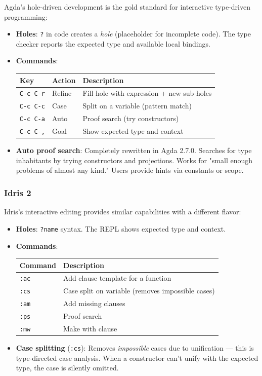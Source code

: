 \documentclass[11pt]{article}
\begin{document}
Agda's hole-driven development is the gold standard for interactive type-driven
programming:

\begin{itemize}
\item \textbf{Holes}: \texttt{?} in code creates a \emph{hole} (placeholder for incomplete code). The
type checker reports the expected type and available local bindings.

\item \textbf{Commands}:
\begin{center}
\begin{tabular}{lll}
Key & Action & Description\\
\hline
\texttt{C-c C-r} & Refine & Fill hole with expression + new sub-holes\\
\texttt{C-c C-c} & Case & Split on a variable (pattern match)\\
\texttt{C-c C-a} & Auto & Proof search (try constructors)\\
\texttt{C-c C-,} & Goal & Show expected type and context\\
\end{tabular}
\end{center}

\item \textbf{Auto proof search}: Completely rewritten in Agda 2.7.0. Searches for type
inhabitants by trying constructors and projections. Works for "small enough
problems of almost any kind." Users provide hints via constants or scope.
\end{itemize}
\subsubsection{Idris 2}
\label{sec:org099d2d2}

Idris's interactive editing provides similar capabilities with a different
flavor:

\begin{itemize}
\item \textbf{Holes}: \texttt{?name} syntax. The REPL shows expected type and context.

\item \textbf{Commands}:
\begin{center}
\begin{tabular}{ll}
Command & Description\\
\hline
\texttt{:ac} & Add clause template for a function\\
\texttt{:cs} & Case split on variable (removes impossible cases)\\
\texttt{:am} & Add missing clauses\\
\texttt{:ps} & Proof search\\
\texttt{:mw} & Make with clause\\
\end{tabular}
\end{center}

\item \textbf{Case splitting} (\texttt{:cs}): Removes \emph{impossible} cases due to unification ---
this is type-directed case analysis. When a constructor can't unify with the
expected type, the case is silently omitted.
\end{itemize}
\end{document}

